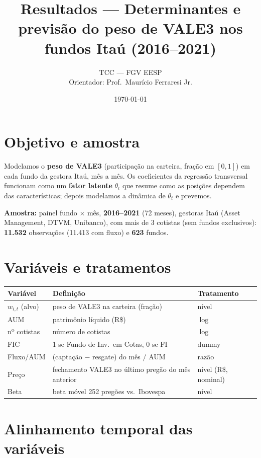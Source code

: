 \documentclass[11pt]{article}
\title{\textbf{Resultados — Determinantes e previsão do peso de VALE3 nos fundos Itaú (2016--2021)}}
\author{TCC — FGV EESP \\ Orientador: Prof.\ Maurício Ferraresi Jr.}
\date{\today}
\begin{document}
\maketitle

\section{Objetivo e amostra}

Modelamos o \textbf{peso de VALE3} (participação na carteira, fração em $[0,1]$) em
cada fundo da gestora Itaú, mês a mês. Os coeficientes da regressão transversal
funcionam como um \textbf{fator latente} $\theta_t$ que resume como as posições
dependem das características; depois modelamos a dinâmica de $\theta_t$ e prevemos.

\medskip
\noindent\textbf{Amostra:} painel fundo $\times$ mês, \textbf{2016--2021} (72 meses),
gestoras Itaú (Asset Management, DTVM, Unibanco), com mais de 3 cotistas (sem fundos
exclusivos): \textbf{11.532} observações (11.413 com fluxo) e \textbf{623} fundos.

\section{Variáveis e tratamentos}

\begin{table}[h]\centering\small
\begin{tabular}{@{}lll@{}}
\toprule
\textbf{Variável} & \textbf{Definição} & \textbf{Tratamento} \\
\midrule
$w_{i,t}$ (alvo) & peso de VALE3 na carteira (fração) & nível \\
AUM & patrimônio líquido (R\$) & $\log$ \\
nº cotistas & número de cotistas & $\log$ \\
FIC & 1 se Fundo de Inv.\ em Cotas, 0 se FI & dummy \\
Fluxo/AUM & (captação $-$ resgate) do mês $/$ AUM & razão \\
Preço & fechamento VALE3 no último pregão do mês anterior & nível (R\$, nominal) \\
Beta & beta móvel 252 pregões vs.\ Ibovespa & nível \\
\bottomrule
\end{tabular}
\end{table}

\section{Alinhamento temporal das variáveis}
\end{document}
